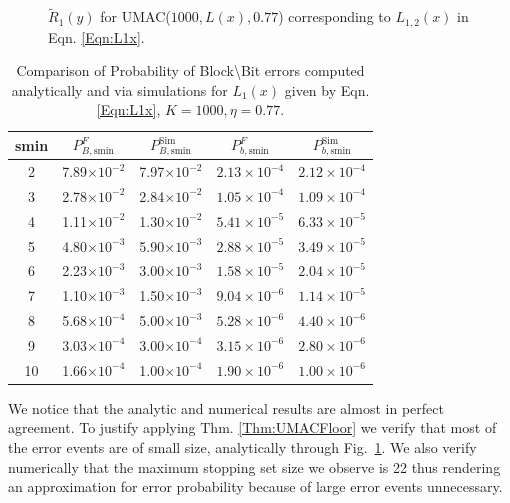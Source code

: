 \begin{figure}
\centering
\setlength{}
\setlength{}

\caption{$\tilde{R}_{1}(y)$ for UMAC($1000,L(x),0.77$) corresponding to $L_{1,2}(x)$ in Eqn. \eqref{Eqn:L1x}.}
\label{Fig:UMAC_Residual}
\end{figure}

\begin{table}
\centering
\begin{tabular}{c c c c c}
\hline  \hline
smin & $P_{B,\text{smin}}^F$ & $P_{B,\text{smin}}^{\text{Sim}}$ & $P_{b,\text{smin}}^F$ & $P_{b,\text{smin}}^{\text{Sim}}$ \\
\hline
2 & 7.89$\times 10^{-2}$  &  7.97$\times 10^{-2}$ &$2.13\times 10^{-4}$&$2.12\times 10^{-4}$\\
3 & 2.78$\times 10^{-2}$  & 2.84$\times 10^{-2}$&$1.05\times 10^{-4}$&$1.09\times 10^{-4}$ \\
4 & 1.11$\times 10^{-2}$  &1.30$\times 10^{-2}$ &$5.41\times 10^{-5}$&$6.33\times 10^{-5}$\\
5 & 4.80$\times 10^{-3}$  &5.90$\times 10^{-3}$& $2.88\times 10^{-5}$&$3.49\times 10^{-5}$\\
6 & 2.23$\times 10^{-3}$  &3.00$\times 10^{-3}$ &$1.58\times 10^{-5}$&$2.04\times 10^{-5}$\\
7 & 1.10$\times 10^{-3}$  &1.50$\times 10^{-3}$ &$9.04\times 10^{-6}$&$1.14\times 10^{-5}$\\
8 &5.68$\times 10^{-4}$   &5.00$\times 10^{-3}$&$5.28\times 10^{-6}$&$4.40\times 10^{-6}$\\
9 & 3.03$\times 10^{-4}$  &3.00$\times 10^{-4}$ & $3.15\times 10^{-6}$&$2.80\times 10^{-6}$\\
10 & 1.66$\times 10^{-4}$ &1.00$\times 10^{-4}$&$1.90\times 10^{-6}$&$1.00\times 10^{-6}$\\
\end{tabular}
\caption{Comparison of Probability of Block\textbackslash Bit errors computed analytically and via simulations for $L_1(x)$ given by Eqn. \eqref{Eqn:L1x}, $K=1000, \eta=0.77$.}
\label{Table:SimvsAnalytic1}
\end{table}

We notice that the analytic and numerical results are almost in perfect agreement. To justify applying Thm. \ref{Thm:UMACFloor} we verify that most of the error events are of small size, analytically through Fig.~\ref{Fig:UMAC_Residual}. We also verify numerically that the maximum stopping set size we observe is 22 thus rendering an approximation for error probability because of large error events unnecessary. \\

